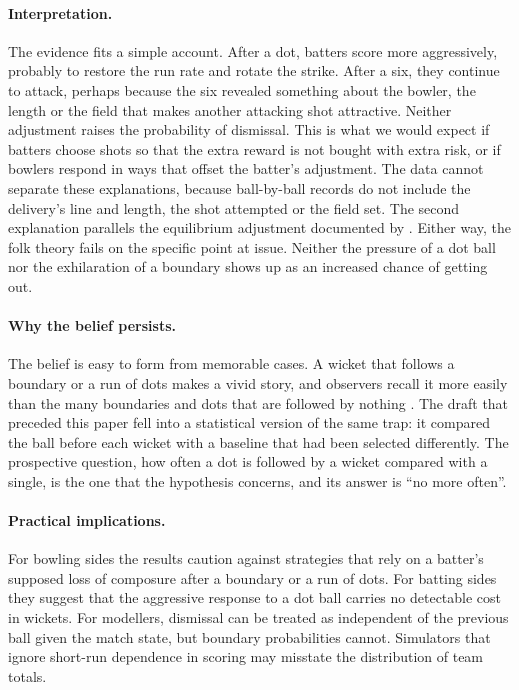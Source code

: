 \documentclass[11pt]{article}
\begin{document}
\paragraph{Interpretation.} The evidence fits a simple account. After a dot, batters score more aggressively, probably to restore the run rate and rotate the strike. After a six, they continue to attack, perhaps because the six revealed something about the bowler, the length or the field that makes another attacking shot attractive. Neither adjustment raises the probability of dismissal. This is what we would expect if batters choose shots so that the extra reward is not bought with extra risk, or if bowlers respond in ways that offset the batter's adjustment. The data cannot separate these explanations, because ball-by-ball records do not include the delivery's line and length, the shot attempted or the field set. The second explanation parallels the equilibrium adjustment documented by \citet{green2018hot}. Either way, the folk theory fails on the specific point at issue. Neither the pressure of a dot ball nor the exhilaration of a boundary shows up as an increased chance of getting out.

\paragraph{Why the belief persists.} The belief is easy to form from memorable cases. A wicket that follows a boundary or a run of dots makes a vivid story, and observers recall it more easily than the many boundaries and dots that are followed by nothing \citep{tversky1973availability}. The draft that preceded this paper fell into a statistical version of the same trap: it compared the ball before each wicket with a baseline that had been selected differently. The prospective question, how often a dot is followed by a wicket compared with a single, is the one that the hypothesis concerns, and its answer is ``no more often''.

\paragraph{Practical implications.} For bowling sides the results caution against strategies that rely on a batter's supposed loss of composure after a boundary or a run of dots. For batting sides they suggest that the aggressive response to a dot ball carries no detectable cost in wickets. For modellers, dismissal can be treated as independent of the previous ball given the match state, but boundary probabilities cannot. Simulators that ignore short-run dependence in scoring may misstate the distribution of team totals.
\end{document}
